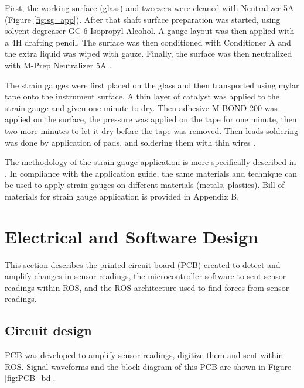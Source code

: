     First, the working surface (glass) and tweezers were cleaned with Neutralizer 5A (Figure \ref{fig:sg_app}). 
    After that shaft surface preparation was started, using solvent degreaser GC-6 Isopropyl Alcohol. 
    A gauge layout was then applied with a 4H drafting pencil. The surface was then conditioned with Conditioner A and the extra liquid was wiped with gauze. 
    Finally, the surface was then neutralized with M-Prep Neutralizer 5A \cite{StrGugeInst}.

    The strain gauges were first placed on the glass and then transported using mylar tape onto the instrument surface. A thin layer of catalyst was applied to the strain gauge and given one minute to dry. Then adhesive M-BOND 200 was applied on the surface, the pressure was applied on the tape for one minute, then two more minutes to let it dry before the tape was removed. Then leads soldering was done by application of pads, and soldering them with thin wires \cite{youtube}.

    The methodology of the strain gauge application is more specifically described in \cite{StrGugeInst}. In compliance with the application guide, the same materials and technique can be used to apply strain gauges on different materials (metals, plastics). 
    Bill of materials for strain gauge application is provided in Appendix B.

\section{Electrical and Software Design}
\label{sec:elecDes}
This section describes the printed circuit board (PCB) created to detect and amplify changes in sensor readings, the microcontroller software to sent sensor readings within ROS, and the ROS architecture used to find forces from sensor readings.

	\subsection{Circuit design}
	\label{sec:cirDes}
	
	PCB was developed to amplify sensor readings, digitize them and sent within ROS. Signal waveforms and the block diagram of this PCB are shown in Figure \ref{fig:PCB_bd}.

